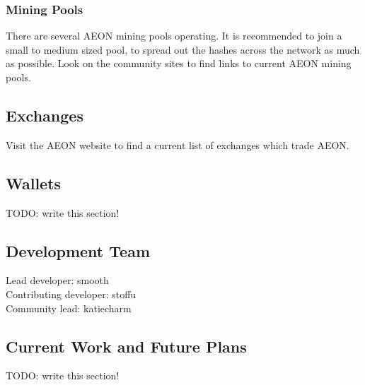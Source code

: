 \subsubsection{Mining Pools}
There are several AEON mining pools operating. It is recommended to join a small to medium sized pool, to spread out the hashes across the network as much as possible.  Look on the community sites to find links to current AEON mining pools.

\subsection{Exchanges}
Visit the AEON website to find a current list of exchanges which trade AEON.

\subsection{Wallets}
TODO:  write this section!

\subsection{Development Team}
Lead developer:		smooth\\
Contributing developer:	stoffu\\
Community lead:		katiecharm\\

\subsection{Current Work and Future Plans}
TODO:  write this section!
